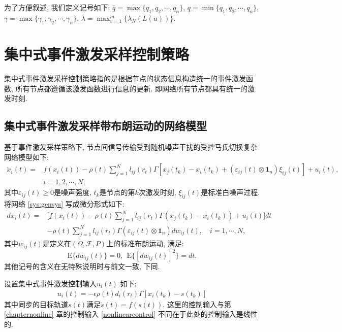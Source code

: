         为了方便叙述, 我们定义记号如下: $\bar q=\max\{q_1,q_2,\cdots,q_n\}$, $\underline{q}=\min\{q_1,q_2,\cdots,q_n\}$, $\bar\gamma=\max\{\gamma_1,\gamma_2,\cdots,\gamma_n\}$, $\bar\lambda=\max^m_{v=1}\{\lambda_N(L(u))\}$.

\section{集中式事件激发采样控制策略}\label{result}
        集中式事件激发采样控制策略指的是根据节点的状态信息构造统一的事件激发函数, 所有节点都遵循该激发函数进行信息的更新. 即网络所有节点都具有统一的激发时刻.
\subsection{集中式事件激发采样带布朗运动的网络模型}\label{centralized}
        基于事件激发采样策略下, 节点间信号传输受到随机噪声干扰的受控马氏切换复杂网络模型如下:
        \begin{align}\label{sys:gensys}
         \nonumber   \dot{x}_{i}(t)=&f(x_{i}(t))-\rho(t)\sum^N_{j=1}l_{ij}(r_t)\Gamma[x_{j}(t_{k})-x_{i}(t_{k})+(\varepsilon_{ij}(t)\otimes\mathbf{1}_n)\xi_{ij}(t)]+u_i(t),\\
            &i=1,2,\cdots,N,
        \end{align}
      其中$\varepsilon_{ij}(t)\geq 0$是噪声强度, $t_{k}$是节点的第$k$次激发时刻, $\xi_{ij}(t)$是标准白噪声过程. 将网络 \eqref{sys:gensys} 写成微分形式如下:
      \begin{align}\label{sys-dt}
      \nonumber dx_{i}(t)=&\Big[f(x_{i}(t))-\rho(t)\sum^N_{j=1}l_{ij}(r_t)\Gamma(x_{j}(t_{k})-x_{i}(t_{k}))+u_i(t)\Big]dt\\
      &-\rho(t)\sum^N_{j=1}l_{ij}(r_t)\Gamma(\varepsilon_{ij}(t)\otimes\mathbf{1}_n)dw_{ij}(t), \quad i = 1,\cdots,N,
        \end{align}
       其中$w_{ij}(t)$是定义在$(\Omega,\mathcal{F},P)$上的标准布朗运动, 满足:
       $$\mathrm{E}\{dw_{ij}(t)\}=0, ~~\mathrm{E}\{[dw_{ij}(t)]^2\}=dt.$$其他记号的含义在无特殊说明时与前文一致, 下同.

        设置集中式事件激发控制输入$u_i(t)$ 如下:
        \begin{align*}
            u_i(t)=-\epsilon\rho(t)d_{i}(r_{t})\Gamma[x_{i}(t_{k})-s(t_{k})]
        \end{align*}
        其中同步的目标轨道$s(t)$满足$\dot{s}(t)=f(s(t))$. 这里的控制输入与第 \ref{chapternonline} 章的控制输入 \eqref{nonlinearcontrol} 不同在于此处的控制输入是线性的.


